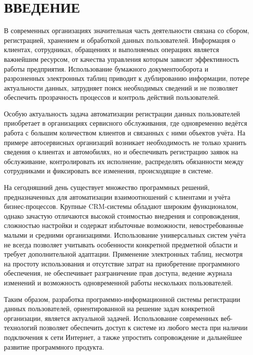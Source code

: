 \section*{ВВЕДЕНИЕ}

В современных организациях значительная часть деятельности связана со сбором, регистрацией, хранением и обработкой данных пользователей. Информация о клиентах, сотрудниках, обращениях и выполняемых операциях является важнейшим ресурсом, от качества управления которым зависит эффективность работы предприятия. Использование бумажного документооборота и разрозненных электронных таблиц приводит к дублированию информации, потере актуальности данных, затрудняет поиск необходимых сведений и не позволяет обеспечить прозрачность процессов и контроль действий пользователей.

Особую актуальность задача автоматизации регистрации данных пользователей приобретает в организациях сервисного обслуживания, где одновременно ведётся работа с большим количеством клиентов и связанных с ними объектов учёта. На примере автосервисных организаций возникает необходимость не только хранить сведения о клиентах и автомобилях, но и обеспечивать регистрацию заявок на обслуживание, контролировать их исполнение, распределять обязанности между сотрудниками и фиксировать все изменения, происходящие в системе.

На сегодняшний день существует множество программных решений, предназначенных для автоматизации взаимоотношений с клиентами и учёта бизнес-процессов. Крупные CRM-системы обладают широким функционалом, однако зачастую отличаются высокой стоимостью внедрения и сопровождения, сложностью настройки и содержат избыточные возможности, невостребованные малыми и средними организациями. Использование универсальных систем учёта не всегда позволяет учитывать особенности конкретной предметной области и требует дополнительной адаптации. Применение электронных таблиц, несмотря на простоту использования и отсутствие затрат на приобретение программного обеспечения, не обеспечивает разграничение прав доступа, ведение журнала изменений и возможность одновременной работы нескольких пользователей.

Таким образом, разработка программно-информационной системы регистрации данных пользователей, ориентированной на решение задач конкретной организации, является актуальной задачей. Использование современных веб-технологий позволяет обеспечить доступ к системе из любого места при наличии подключения к сети Интернет, а также упростить сопровождение и дальнейшее развитие программного продукта.

